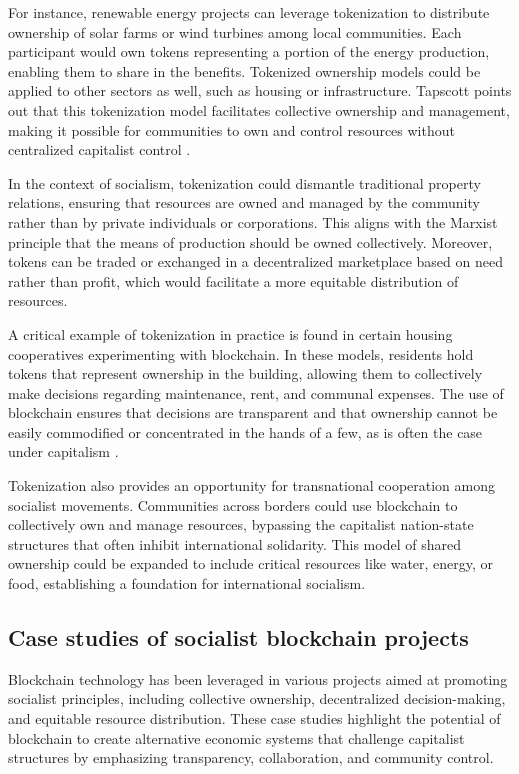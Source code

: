 \begin{refsection}
For instance, renewable energy projects can leverage tokenization to distribute ownership of solar farms or wind turbines among local communities. Each participant would own tokens representing a portion of the energy production, enabling them to share in the benefits. Tokenized ownership models could be applied to other sectors as well, such as housing or infrastructure. Tapscott points out that this tokenization model facilitates collective ownership and management, making it possible for communities to own and control resources without centralized capitalist control \cite[pp.~151-154]{tapscott2016}. 

In the context of socialism, tokenization could dismantle traditional property relations, ensuring that resources are owned and managed by the community rather than by private individuals or corporations. This aligns with the Marxist principle that the means of production should be owned collectively. Moreover, tokens can be traded or exchanged in a decentralized marketplace based on need rather than profit, which would facilitate a more equitable distribution of resources.

A critical example of tokenization in practice is found in certain housing cooperatives experimenting with blockchain. In these models, residents hold tokens that represent ownership in the building, allowing them to collectively make decisions regarding maintenance, rent, and communal expenses. The use of blockchain ensures that decisions are transparent and that ownership cannot be easily commodified or concentrated in the hands of a few, as is often the case under capitalism \cite[pp.~124-127]{mazzucato2023}.

Tokenization also provides an opportunity for transnational cooperation among socialist movements. Communities across borders could use blockchain to collectively own and manage resources, bypassing the capitalist nation-state structures that often inhibit international solidarity. This model of shared ownership could be expanded to include critical resources like water, energy, or food, establishing a foundation for international socialism.

\subsection{Case studies of socialist blockchain projects}

Blockchain technology has been leveraged in various projects aimed at promoting socialist principles, including collective ownership, decentralized decision-making, and equitable resource distribution. These case studies highlight the potential of blockchain to create alternative economic systems that challenge capitalist structures by emphasizing transparency, collaboration, and community control.


\end{refsection}

